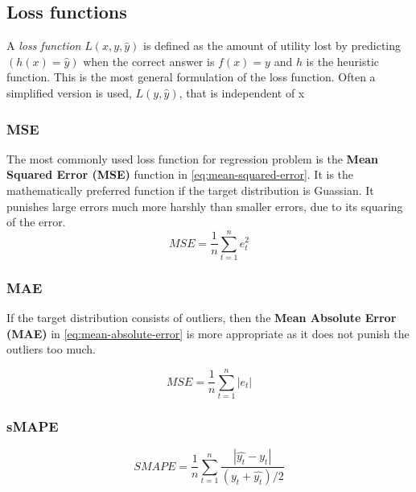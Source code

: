 \subsection{Loss functions}
\label{loss-functions}
A \textit{loss function} $L(x, y, \hat{y})$ is defined as the amount of utility lost by predicting 
$(h(x)=\hat{y})$ when the correct answer is $f(x) = y$ and $h$ is the heuristic function.
This is the most general formulation of the loss function. Often a simplified version is used,
$L(y, \hat{y})$, that is independent of x %
\subsubsection{MSE}
The most commonly used loss function for regression problem is the 
\textbf{Mean Squared Error (MSE)} function in \autoref{eq:mean-squared-error}.
It is the mathematically preferred function if the target distribution is Guassian.
It punishes large errors much more harshly than smaller errors, due to its squaring of the error.
\begin{equation}
  \label{eq:mean-squared-error}
  MSE = \frac{1}{n} \sum_{t=1}^n e_t^2
\end{equation}

\subsubsection{MAE}
If the target distribution consists of outliers, then the 
\textbf{Mean Absolute Error (MAE)} in \autoref{eq:mean-absolute-error} is more appropriate
as it does not punish the outliers too much.

\begin{equation}
  \label{eq:mean-absolute-error}
  MSE = \frac{1}{n} \sum_{t=1}^n |e_t|
\end{equation}

\subsubsection{sMAPE}
\begin{equation}
  \label{eq:sMape}
  SMAPE = \frac{1}{n} \sum_{t=1}^n \frac{|\hat{y_t} - y_t|}{(y_t + \hat{y_t}) / 2}
\end{equation}


